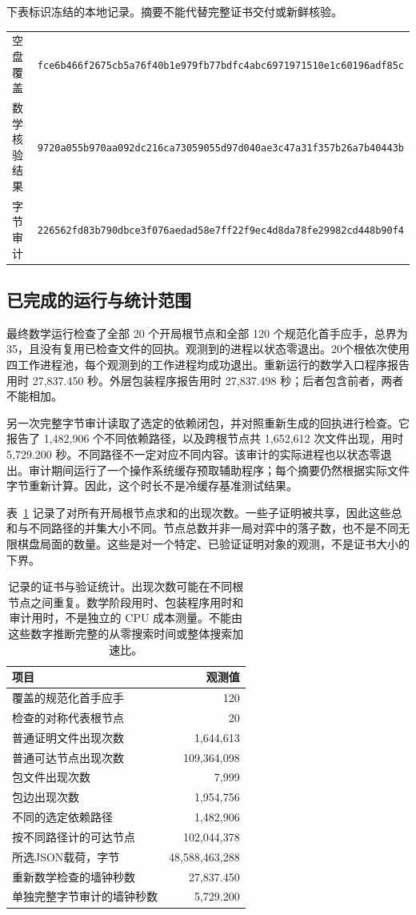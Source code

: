 \documentclass[11pt]{article}
\theoremstyle{definition}
\theoremstyle{remark}
\begin{document}
下表标识冻结的本地记录。摘要不能代替完整证书交付或新鲜核验。
\begin{center}\scriptsize
\begin{tabular}{@{}ll@{}}
空盘覆盖 & \texttt{fce6b466f2675cb5a76f40b1e979fb77bdfc4abc6971971510e1c60196adf85c}\\
数学核验结果 & \texttt{9720a055b970aa092dc216ca73059055d97d040ae3c47a31f357b26a7b40443b}\\
字节审计 & \texttt{226562fd83b790dbce3f076aedad58e7ff22f9ec4d8da78fe29982cd448b90f4}
\end{tabular}\end{center}

\subsection{已完成的运行与统计范围}
最终数学运行检查了全部 20 个开局根节点和全部 120 个规范化首手应手，总界为 35，且没有复用已检查文件的回执。观测到的进程以状态零退出。20个根依次使用四工作进程池，每个观测到的工作进程均成功退出。重新运行的数学入口程序报告用时 27,837.450 秒。外层包装程序报告用时 27,837.498 秒；后者包含前者，两者不能相加。

另一次完整字节审计读取了选定的依赖闭包，并对照重新生成的回执进行检查。它报告了 1,482,906 个不同依赖路径，以及跨根节点共 1,652,612 次文件出现，用时 5,729.200 秒。不同路径不一定对应不同内容。该审计的实际进程也以状态零退出。审计期间运行了一个操作系统缓存预取辅助程序；每个摘要仍然根据实际文件字节重新计算。因此，这个时长不是冷缓存基准测试结果。

表~\ref{tab:counts} 记录了对所有开局根节点求和的出现次数。一些子证明被共享，因此这些总和与不同路径的并集大小不同。节点总数并非一局对弈中的落子数，也不是不同无限棋盘局面的数量。这些是对一个特定、已验证证明对象的观测，不是证书大小的下界。

\begin{table}[ht]
\centering
\begin{tabular}{lr}
\toprule 项目 & 观测值\\\midrule
覆盖的规范化首手应手 & 120\\
检查的对称代表根节点 & 20\\
普通证明文件出现次数 & 1,644,613\\
普通可达节点出现次数 & 109,364,098\\
包文件出现次数 & 7,999\\
包边出现次数 & 1,954,756\\
不同的选定依赖路径 & 1,482,906\\
按不同路径计的可达节点 & 102,044,378\\
所选JSON载荷，字节 & 48,588,463,288\\
重新数学检查的墙钟秒数 & 27,837.450\\
单独完整字节审计的墙钟秒数 & 5,729.200\\
\bottomrule
\end{tabular}
\caption{记录的证书与验证统计。出现次数可能在不同根节点之间重复。数学阶段用时、包装程序用时和审计用时，不是独立的 CPU 成本测量。不能由这些数字推断完整的从零搜索时间或整体搜索加速比。}
\label{tab:counts}
\end{table}
\end{document}

